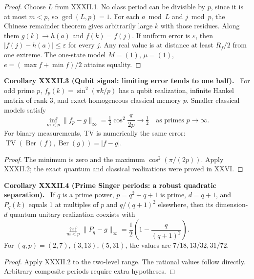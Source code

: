 \documentclass[11pt,a4paper,oneside]{book}
\newcommand{\statement}[3]{\par\medskip\noindent\textbf{#1 #2 (#3).}\ }
\begin{document}
\begin{proof}Choose $L$ from XXXII.1. No class period can be divisible by $p$, since it is at most $m<p$, so $\gcd(L,p)=1$. For each $a\bmod L$ and $j\bmod p$, the Chinese remainder theorem gives arbitrarily large $k$ with those residues. Along them $g(k)\to h(a)$ and $f(k)=f(j)$. If uniform error is $\varepsilon$, then $|f(j)-h(a)|\le\varepsilon$ for every $j$. Any real value is at distance at least $R_f/2$ from one extreme. The one-state model $M=(1)$, $\mu=(1)$, $e=(\max f+\min f)/2$ attains equality.\end{proof}
\statement{Corollary}{XXXII.3}{Qubit signal: limiting error tends to one half} For odd prime $p$, $f_p(k)=\sin^2(\pi k/p)$ has a qubit realization, infinite Hankel matrix of rank 3, and exact homogeneous classical memory $p$. Smaller classical models satisfy
\begin{equation}\inf_{m<p}\|f_p-g\|_\infty=\tfrac12\cos^2\frac\pi{2p}\longrightarrow\tfrac12\quad\text{as primes }p\to\infty.\tag{114}\end{equation}
For binary measurements, TV is numerically the same error: $\operatorname{TV}(\operatorname{Ber}(f),\operatorname{Ber}(g))=|f-g|$.
\begin{proof}The minimum is zero and the maximum $\cos^2(\pi/(2p))$. Apply XXXII.2; the exact quantum and classical realizations were proved in XXVI.\end{proof}
\statement{Corollary}{XXXII.4}{Prime Singer periods: a robust quadratic separation} If $q$ is a prime power, $p=q^2+q+1$ is prime, $d=q+1$, and $P_q(k)$ equals 1 at multiples of $p$ and $q/(q+1)^2$ elsewhere, then its dimension-$d$ quantum unitary realization coexists with
\begin{equation}\inf_{m<p}\|P_q-g\|_\infty=\frac12\left(1-\frac q{(q+1)^2}\right).\tag{115}\end{equation}
For $(q,p)=(2,7),(3,13),(5,31)$, the values are $7/18,13/32,31/72$.
\begin{proof}Apply XXXII.2 to the two-level range. The rational values follow directly. Arbitrary composite periods require extra hypotheses.\end{proof}
\end{document}
